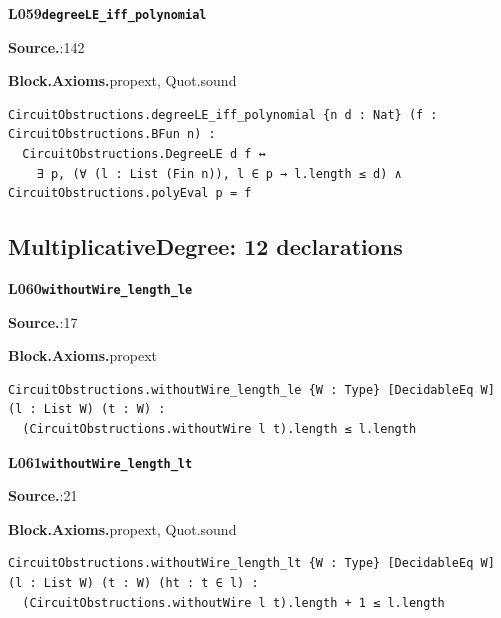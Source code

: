 \par\medskip\noindent\begin{minipage}{\textwidth}
{\small\bfseries L059\enspace\texttt{degreeLE\_iff\_polynomial}\par}
{\footnotesize\raggedright\textbf{Source.}\enspace{}:142\par
\textbf{Block.}\quad\textbf{Axioms.}\enspace propext, Quot.sound\par}\nopagebreak
\begin{lstlisting}
CircuitObstructions.degreeLE_iff_polynomial {n d : Nat} (f : CircuitObstructions.BFun n) :
  CircuitObstructions.DegreeLE d f ↔
    ∃ p, (∀ (l : List (Fin n)), l ∈ p → l.length ≤ d) ∧ CircuitObstructions.polyEval p = f
\end{lstlisting}
\end{minipage}\par

\subsection*{MultiplicativeDegree: 12 declarations}
\par\medskip\noindent\begin{minipage}{\textwidth}
{\small\bfseries L060\enspace\texttt{withoutWire\_length\_le}\par}
{\footnotesize\raggedright\textbf{Source.}\enspace{}:17\par
\textbf{Block.}\quad\textbf{Axioms.}\enspace propext\par}\nopagebreak
\begin{lstlisting}
CircuitObstructions.withoutWire_length_le {W : Type} [DecidableEq W] (l : List W) (t : W) :
  (CircuitObstructions.withoutWire l t).length ≤ l.length
\end{lstlisting}
\end{minipage}\par

\par\medskip\noindent\begin{minipage}{\textwidth}
{\small\bfseries L061\enspace\texttt{withoutWire\_length\_lt}\par}
{\footnotesize\raggedright\textbf{Source.}\enspace{}:21\par
\textbf{Block.}\quad\textbf{Axioms.}\enspace propext, Quot.sound\par}\nopagebreak
\begin{lstlisting}
CircuitObstructions.withoutWire_length_lt {W : Type} [DecidableEq W] (l : List W) (t : W) (ht : t ∈ l) :
  (CircuitObstructions.withoutWire l t).length + 1 ≤ l.length
\end{lstlisting}
\end{minipage}\par

